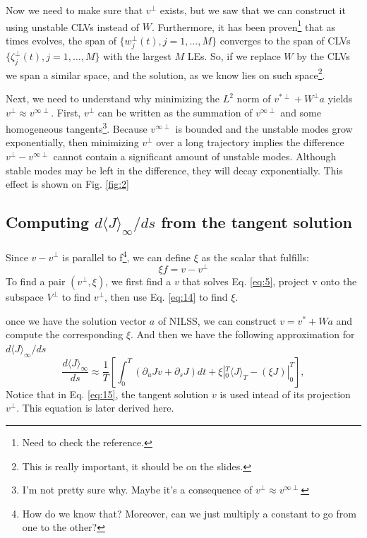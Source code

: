 \documentclass[10pt,twoside,a4paper]{article} %
\begin{document}
Now we need to make sure that $v^\perp$ exists, but we saw that we can construct it using unstable CLVs instead of $W$. Furthermore, it has been proven\footnote{Need to check the reference.} that as times evolves, the span of $\{w_j^\perp(t), j=1,\ldots,M\}$ converges to the span of CLVs $\{\zeta_j^\perp(t), j=1,\ldots,M\}$ with the largest $M$ LEs. So, if we replace $W$ by the CLVs we span a similar space, and the solution, as we know lies on such space\footnote{This is really important, it should be on the slides.}.

Next, we need to understand why minimizing the $L^2$ norm of $v^{*\perp} + W^\perp a$ yields $v^\perp \approx v^{\infty\perp}$. First, $v^\perp$ can be written as the summation of $v^{\infty \perp}$ and some homogeneous tangents\footnote{I'm not pretty sure why. Maybe it's a consequence of $v^\perp\approx v^{\infty\perp}$}. Because $v^{\infty\perp}$ is bounded and the unstable modes grow exponentially, then minimizing $v^\perp$ over a long trajectory implies the difference $v^\perp - v^{\infty\perp}$
cannot contain a significant amount of unstable modes. Although stable modes may be left in the difference, they will decay exponentially. This effect is shown on Fig. \ref{fig:2}

\subsection{Computing $d\langle J \rangle_\infty /ds$ from the tangent solution}\label{3.4}
Since $v-v^\perp$ is parallel to f\footnote{How do we know that? Moreover, can we just multiply a constant to go from one to the other?}, we can define $\xi$ as the scalar that fulfills:
\begin{equation}
  \xi f = v - v^\perp
  \label{eq:14}
\end{equation}
To find a pair $(v^\perp,\xi)$, we first find a $v$ that solves Eq. \ref{eq:5}, project v onto the subspace $V^\perp$ to find $v^\perp$, then use Eq. \ref{eq:14} to find $\xi$.

once we have the solution vector $a$ of NILSS, we can construct $v=v^{*} + Wa$ and compute the corresponding $\xi$. And then we have the following approximation for $d\langle J \rangle_\infty / ds$
\begin{equation}
  \frac{d\langle J \rangle_\infty}{ds} \approx \frac{1}{T}\left[ \int_0^T (\partial_u Jv + \partial_s J)dt + \xi|_0^T \langle J \rangle_T - (\xi J)|_0^T\right],
  \label{eq:15}
\end{equation}
Notice that in Eq. \ref{eq:15}, the tangent solution $v$ is used intead of its projection $v^\perp$. This equation is later derived here.
\end{document}
